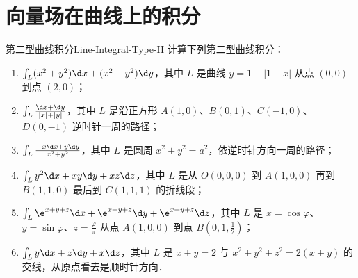 \section{向量场在曲线上的积分}

\begin{problem}{第二型曲线积分}{Line-Integral-Type-II}
    计算下列第二型曲线积分：
    \begin{enumerate}
        \item $\int_L (x^2 + y^2) \d x + (x^2 - y^2) \d y$，其中 $L$ 是曲线 $y = 1 - |1 - x|$ 从点 $(0,0)$ 到点 $(2,0)$；
        \item $\int_L \frac{\d x + \d y}{|x| + |y|}$，其中 $L$ 是沿正方形 $A(1,0)$、$B(0,1)$、$C(-1,0)$、$D(0,-1)$ 逆时针一周的路径；
        \item $\int_L \frac{-x \d x + y \d y}{x^2 + y^2}$，其中 $L$ 是圆周 $x^2 + y^2 = a^2$，依逆时针方向一周的路径；
        \item $\int_L y^2 \d x + xy \d y + xz \d z$，其中 $L$ 是从 $O(0,0,0)$ 到 $A(1,0,0)$ 再到 $B(1,1,0)$ 最后到 $C(1,1,1)$ 的折线段；
        \item $\int_L \e^{x+y+z} \d x + \e^{x+y+z} \d y + \e^{x+y+z} \d z$，其中 $L$ 是 $x = \cos \varphi$、$y = \sin \varphi$、$z = \frac{\varphi}{\uppi}$ 从点 $A(1,0,0)$ 到点 $B(0,1,\frac{1}{2})$；
        \item $\int_L y \d x + z \d y + x \d z$，其中 $L$ 是 $x + y = 2$ 与 $x^2 + y^2 + z^2 = 2(x + y)$ 的交线，从原点看去是顺时针方向．
    \end{enumerate}
\end{problem}

